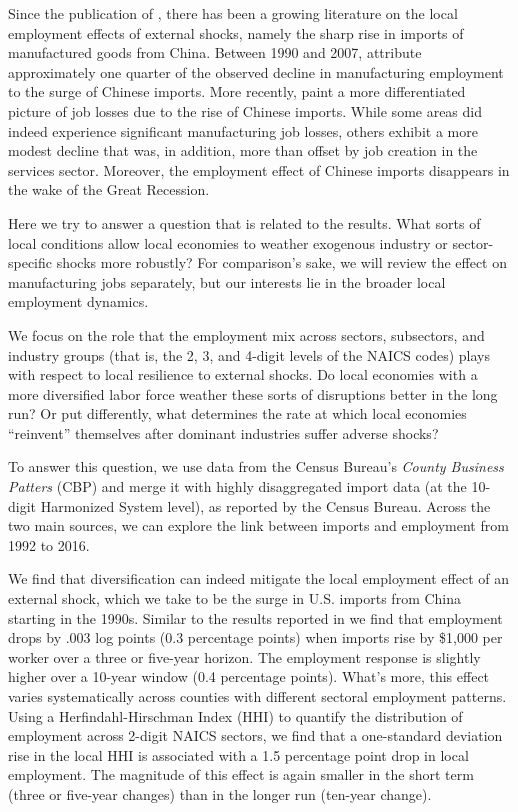 \documentclass[onehalfspacing,11pt]{article}
\begin{document}
Since the publication of \cite{Autor:2013}, there has been a growing literature on the local employment effects of external shocks, namely the sharp rise in imports of manufactured goods from China. Between 1990 and 2007, \cite{Autor:2013} attribute approximately one quarter of the observed decline in manufacturing employment to the surge of Chinese imports. More recently, \cite{Bloom:2019} paint a more differentiated picture of job losses due to the rise of Chinese imports. While some areas did indeed experience significant manufacturing job losses, others exhibit a more modest decline that was, in addition, more than offset by job creation in the services sector. Moreover, the employment effect of Chinese imports disappears in the wake of the Great Recession.

Here we try to answer a question that is related to the \cite{Bloom:2019} results. What sorts of local conditions allow local economies to weather exogenous industry or sector-specific shocks more robustly? For comparison's sake, we will review the effect on manufacturing jobs separately, but our interests lie in the broader local employment dynamics.

We focus on the role that the employment mix across sectors, subsectors, and industry groups (that is, the 2, 3, and 4-digit levels of the NAICS codes) plays with respect to local resilience to external shocks. Do local economies with a more diversified labor force weather these sorts of disruptions better in the long run? Or put differently, what determines the rate at which local economies ``reinvent'' themselves after dominant industries suffer adverse shocks?

To answer this question, we use data from the Census Bureau's  {\it County Business Patters} (CBP) and merge it with highly disaggregated import data (at the 10-digit Harmonized System level), as reported by the Census Bureau. Across the two main sources, we can explore the link between imports and employment from 1992 to 2016.

We find that diversification can indeed mitigate the local employment effect of an external shock, which we take to be the surge in U.S. imports from China starting in the 1990s. Similar to the results reported in \cite{Autor:2013} we find that employment drops by .003 log points (0.3 percentage points) when imports rise by \$1,000 per worker over a three or five-year horizon. The employment response is slightly higher over a 10-year window (0.4 percentage points). What's more, this effect varies systematically across counties with different sectoral employment patterns. Using a Herfindahl-Hirschman Index (HHI) to quantify the distribution of employment across 2-digit NAICS sectors, we find that a one-standard deviation rise in the local HHI is associated with a 1.5 percentage point drop in local employment. The magnitude of this effect is again smaller in the short term (three or five-year changes) than in the longer run (ten-year change).
\end{document}
